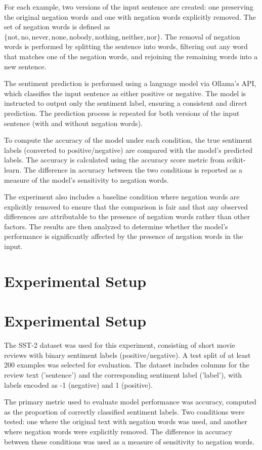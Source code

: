 \documentclass{article}
\begin{document}
For each example, two versions of the input sentence are created: one preserving the original negation words and one with negation words explicitly removed. The set of negation words is defined as $\{\text{not}, \text{no}, \text{never}, \text{none}, \text{nobody}, \text{nothing}, \text{neither}, \text{nor}\}$. The removal of negation words is performed by splitting the sentence into words, filtering out any word that matches one of the negation words, and rejoining the remaining words into a new sentence.

The sentiment prediction is performed using a language model via Ollama's API, which classifies the input sentence as either positive or negative. The model is instructed to output only the sentiment label, ensuring a consistent and direct prediction. The prediction process is repeated for both versions of the input sentence (with and without negation words).

To compute the accuracy of the model under each condition, the true sentiment labels (converted to positive/negative) are compared with the model's predicted labels. The accuracy is calculated using the accuracy score metric from scikit-learn. The difference in accuracy between the two conditions is reported as a measure of the model's sensitivity to negation words.

The experiment also includes a baseline condition where negation words are explicitly removed to ensure that the comparison is fair and that any observed differences are attributable to the presence of negation words rather than other factors. The results are then analyzed to determine whether the model's performance is significantly affected by the presence of negation words in the input.
\section{Experimental Setup}
\section{Experimental Setup}

The SST-2 dataset was used for this experiment, consisting of short movie reviews with binary sentiment labels (positive/negative). A test split of at least 200 examples was selected for evaluation. The dataset includes columns for the review text ('sentence') and the corresponding sentiment label ('label'), with labels encoded as -1 (negative) and 1 (positive). 

The primary metric used to evaluate model performance was accuracy, computed as the proportion of correctly classified sentiment labels. Two conditions were tested: one where the original text with negation words was used, and another where negation words were explicitly removed. The difference in accuracy between these conditions was used as a measure of sensitivity to negation words. 
\end{document}
